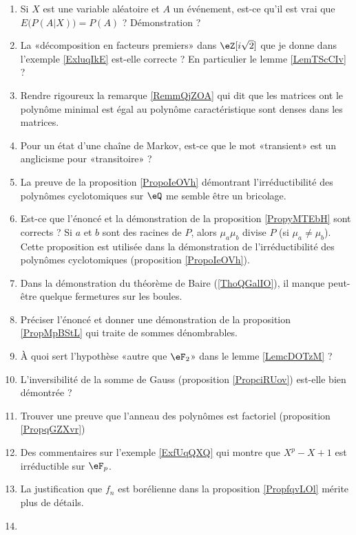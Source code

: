 \begin{enumerate}
    \item
        Si \( X\) est une variable aléatoire et \( A\) un événement, est-ce qu'il est vrai que \( E\big( P(A|X) \big)=P(A)\) ? Démonstration ?
    \item
        La «décomposition en facteurs premiers» dans \( \eZ[i\sqrt{2}]\) que je donne dans l'exemple \ref{ExluqIkE} est-elle correcte ? En particulier le lemme \ref{LemTScCIv} ?
    \item
        Rendre rigoureux la remarque \eqref{RemmQjZOA} qui dit que les matrices ont le polynôme minimal est égal au polynôme caractéristique sont denses dans les matrices.
    \item
        Pour un état d'une chaîne de Markov, est-ce que le mot «transient» est un anglicisme pour «transitoire» ?
    \item
        La preuve de la proposition \ref{PropoIeOVh} démontrant l'irréductibilité des polynômes cyclotomiques sur \( \eQ\) me semble être un bricolage.
    \item
        Est-ce que l'énoncé et la démonstration de la proposition \ref{PropyMTEbH} sont corrects ? Si \( a\) et \( b\) sont des racines de \( P\), alors \( \mu_a\mu_b\) divise \( P\) (si \( \mu_a\neq \mu_b\)). Cette proposition est utilisée dans la démonstration de l'irréductibilité des polynômes cyclotomiques (proposition \ref{PropoIeOVh}).
    \item
        Dans la démonstration du théorème de Baire (\ref{ThoQGalIO}), il manque peut-être quelque fermetures sur les boules.
    \item
        Préciser l'énoncé et donner une démonstration de la proposition \ref{PropMpBStL} qui traite de sommes dénombrables.
    \item
        À quoi sert l'hypothèse «autre que \( \eF_2\)» dans le lemme \ref{LemcDOTzM} ?
    \item
        L'inversibilité de la somme de Gauss (proposition \ref{PropciRUov}) est-elle bien démontrée ?
    \item
        Trouver une preuve que l'anneau des polynômes est factoriel (proposition \ref{PropqGZXvr})
    \item
        Des commentaires sur l'exemple \ref{ExfUqQXQ} qui montre que \( X^p-X+1\) est irréductible sur \( \eF_p\).
    \item
        La justification que \( f_n\) est borélienne dans la proposition \ref{PropfqvLOl} mérite plus de détails.
    \item

\end{enumerate}
